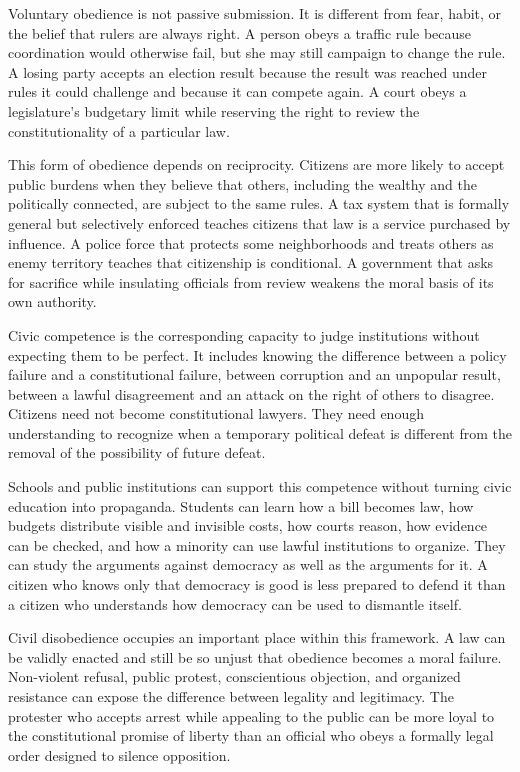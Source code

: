 ﻿\documentclass[12pt,a4paper]{book}
\begin{document}
Voluntary obedience is not passive submission.  It is different from fear,
habit, or the belief that rulers are always right.  A person obeys a traffic
rule because coordination would otherwise fail, but she may still campaign
to change the rule.  A losing party accepts an election result because the
result was reached under rules it could challenge and because it can compete
again.  A court obeys a legislature's budgetary limit while reserving the
right to review the constitutionality of a particular law.

This form of obedience depends on reciprocity.  Citizens are more likely to
accept public burdens when they believe that others, including the wealthy
and the politically connected, are subject to the same rules.  A tax system
that is formally general but selectively enforced teaches citizens that law
is a service purchased by influence.  A police force that protects some
neighborhoods and treats others as enemy territory teaches that citizenship
is conditional.  A government that asks for sacrifice while insulating
officials from review weakens the moral basis of its own authority.

Civic competence is the corresponding capacity to judge institutions without
expecting them to be perfect.  It includes knowing the difference between a
policy failure and a constitutional failure, between corruption and an
unpopular result, between a lawful disagreement and an attack on the right
of others to disagree.  Citizens need not become constitutional lawyers.
They need enough understanding to recognize when a temporary political defeat
is different from the removal of the possibility of future defeat.

Schools and public institutions can support this competence without turning
civic education into propaganda.  Students can learn how a bill becomes
law, how budgets distribute visible and invisible costs, how courts reason,
how evidence can be checked, and how a minority can use lawful institutions
to organize.  They can study the arguments against democracy as well as the
arguments for it.  A citizen who knows only that democracy is good is less
prepared to defend it than a citizen who understands how democracy can be
used to dismantle itself.

Civil disobedience occupies an important place within this framework.  A
law can be validly enacted and still be so unjust that obedience becomes a
moral failure.  Non-violent refusal, public protest, conscientious objection,
and organized resistance can expose the difference between legality and
legitimacy.  The protester who accepts arrest while appealing to the public
can be more loyal to the constitutional promise of liberty than an official
who obeys a formally legal order designed to silence opposition.
\end{document}
